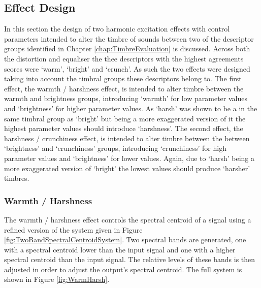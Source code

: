 	\subsection{Effect Design}
	\label{sec:PerceptualExperiments-SemanticControl-EffectDesign}
		In this section the design of two harmonic excitation effects with control parameters intended to alter the
		timbre of sounds between two of the descriptor groups identified in Chapter \ref{chap:TimbreEvaluation} is
		discussed. Across both the distortion and equaliser the thee descriptors with the highest agreements scores
		were `warm', `bright' and `crunch'. As such the two effects were designed taking into account the timbral
		groups these descriptors belong to. The first effect, the warmth / harshness effect, is intended to alter
		timbre between the warmth and brightness groups, introducing `warmth' for low parameter values and
		`brightness' for higher parameter values. As `harsh' was shown to be a in the same timbral group as
		`bright' but being a more exaggerated version of it the highest parameter values should introduce
		`harshness'. The second effect, the harshness / crunchiness effect, is intended to alter timbre between the
		between `brightness' and `crunchiness' groups, introducing `crunchiness' for high parameter values and
		`brightness' for lower values. Again, due to `harsh' being a more exaggerated version of `bright' the
		lowest values should produce `harsher' timbres.

		\subsubsection*{Warmth / Harshness}
			The warmth / harshness effect controls the spectral centroid of a signal using a refined version of
			the system given in Figure \ref{fig:TwoBandSpectralCentroidSystem}. Two spectral bands are
			generated, one with a spectral centroid lower than the input signal and one with a higher spectral
			centroid than the input signal. The relative levels of these bands is then adjusted in order to
			adjust the output's spectral centroid. The full system is shown in Figure \ref{fig:WarmHarsh}.

